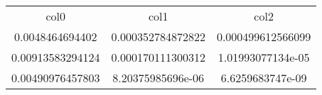 \begin{table}
\begin{tabular}{ccc}
col0 & col1 & col2 \\
0.0048464694402 & 0.000352784872822 & 0.000499612566099 \\
0.00913583294124 & 0.000170111300312 & 1.01993077134e-05 \\
0.00490976457803 & 8.20375985696e-06 & 6.6259683747e-09 \\
\end{tabular}
\end{table}

